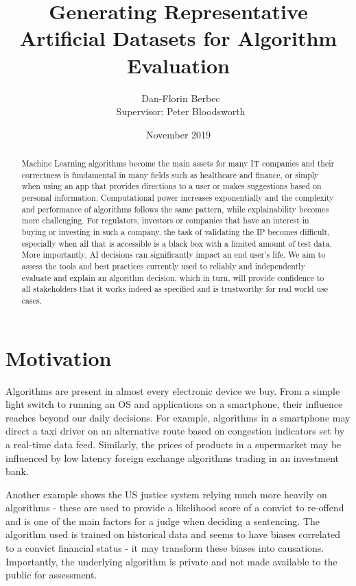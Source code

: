 \documentclass[proposal]{softeng}
\title{Generating Representative Artificial Datasets for Algorithm Evaluation}
\author{\ Dan-Florin Berbec \\ \ Supervisor: Peter Bloodsworth}
\date{November 2019}
\begin{document}
\maketitle

\newpage
\clearpage\mbox{}\clearpage

\begin{abstract}
Machine Learning algorithms become the main assets for many IT companies and their correctness is fundamental in many fields such as healthcare and finance, or simply when using an app that provides directions to a user or makes suggestions based on personal information. Computational power increases exponentially and the complexity and performance of algorithms follows the same pattern, while explainability becomes more challenging. For regulators, investors or companies that have an interest in buying or investing in such a company, the task of validating the IP becomes difficult, especially when all that is accessible is a black box with a limited amount of test data. More importantly, AI decisions can significantly impact an end user's life. We aim to assess the tools and best practices currently used to reliably and independently evaluate and explain an algorithm decision, which in turn, will provide confidence to all stakeholders that it works indeed as specified and is trustworthy for real world use cases.\end{abstract}
 
\tableofcontents
\newpage
\section{Motivation}
Algorithms are present in almost every electronic device we buy. From a simple light switch to running an OS and applications on a smartphone, their influence reaches beyond our daily decisions. For example, algorithms in a smartphone may direct a taxi driver on an alternative route based on congestion indicators set by a real-time data feed. Similarly, the prices of products in a supermarket may be influenced by low latency foreign exchange algorithms trading in an investment bank.

Another example shows the US justice system relying much more heavily on algorithms - these are used to provide a likelihood score of a convict to re-offend and is one of the main factors for a judge when deciding a sentencing\cite{jail}. The algorithm used is trained on historical data and seems to have biases correlated to a convict financial status - it may transform these biases into causations. Importantly, the underlying algorithm is private and not made available to the public for assessment.
\end{document}

